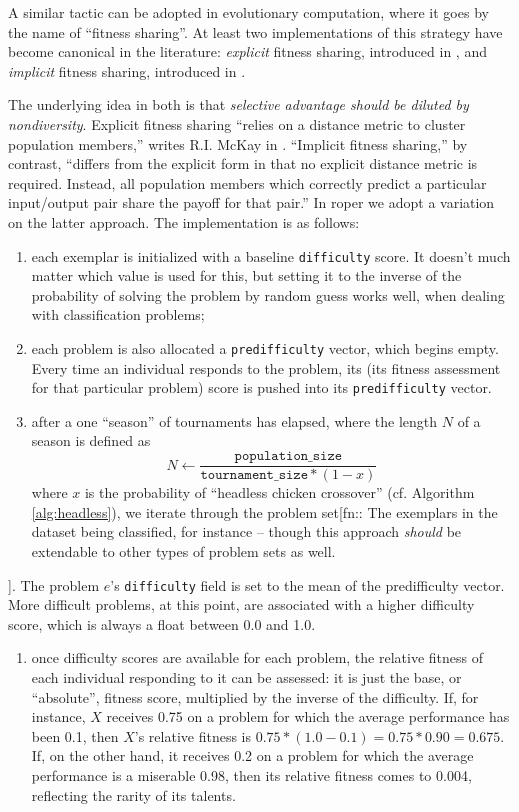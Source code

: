 \documentclass[12pt,glossary]{dalthesis}
\begin{document}
A similar tactic can be adopted in evolutionary computation, where it goes by
the name of ``fitness sharing''. At least two implementations of this strategy
have become canonical in the literature: \emph{explicit} fitness sharing, introduced
in \cite{deb89}, and \emph{implicit} fitness sharing, introduced in \cite{smith92}.

The underlying idea in both is that \emph{selective advantage should be diluted by
nondiversity}. Explicit fitness sharing ``relies on a distance metric to cluster
population members,'' writes R.I. McKay in \cite{mckay00}. ``Implicit fitness sharing,''
by contrast, ``differs from the explicit form in that no explicit distance metric
is required. Instead, all population members which correctly predict a particular
input/output pair share the payoff for that pair.'' 
In \gls{roper} we adopt a variation on the latter approach. The implementation is as
follows:

\begin{enumerate}
\item each exemplar is initialized with a baseline
\texttt{difficulty} score. It doesn't much matter which value is used for this,
but setting it to the inverse of the probability of solving the problem 
by random guess works well, when dealing with classification problems;

\item each problem is also allocated a \texttt{predifficulty} vector, which begins empty.
Every time an individual responds to the problem, its (its fitness assessment
for that particular problem) score is pushed into its \texttt{predifficulty} vector.

\item after a one ``season'' of tournaments has elapsed, where the length \(N\) 
  of a season is defined as
  $$N \gets \frac{\texttt{population\_size}}{\texttt{tournament\_size} * (1 - x)}$$
  where \(x\) is the probability of ``headless chicken crossover'' (cf. Algorithm
  \ref{alg:headless}), we iterate through the problem set[fn:: 
The exemplars in the dataset being classified, for instance -- though this approach \emph{should} be extendable to other types of problem sets as well.
\end{enumerate}
]. The
    problem \(e\)'s \texttt{difficulty} field is set to the mean of the predifficulty
    vector. More difficult problems, at this point, are associated with a higher
    difficulty score, which is always a float between 0.0 and 1.0. 

\begin{enumerate}
\item once difficulty scores are available for each problem, the relative fitness of
each individual responding to it can be assessed: it is just the base, or ``absolute'',
fitness score, multiplied by the inverse of the difficulty. If, for instance, 
\(X\) receives 0.75 on a problem for which the average performance has been
0.1, then \(X\)'s relative fitness is \(0.75 * (1.0 - 0.1) = 0.75 * 0.90 = 0.675\).
If, on the other hand, it receives 0.2 on a problem for which the average performance
is a miserable 0.98, then its relative fitness comes to 0.004, reflecting the
rarity of its talents.
\end{enumerate}
\end{document}
